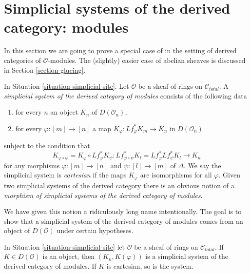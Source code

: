 








\section{Simplicial systems of the derived category: modules}
\label{section-glueing-modules}

\noindent
In this section we are going to prove a special case of
\cite[Proposition 3.2.9]{BBD} in the setting of derived
categories of $\mathcal{O}$-modules. The (slightly) easier
case of abelian sheaves is discussed in Section \ref{section-glueing}.

\begin{definition}
\label{definition-cartesian-derived-modules}
In Situation \ref{situation-simplicial-site}. Let $\mathcal{O}$
be a sheaf of rings on $\mathcal{C}_{total}$. A
{\it simplicial system of the derived category of modules}
consists of the following data
\begin{enumerate}
\item for every $n$ an object $K_n$ of $D(\mathcal{O}_n)$,
\item for every $\varphi : [m] \to [n]$ a map
$K_\varphi : Lf_\varphi^*K_m \to K_n$ in $D(\mathcal{O}_n)$
\end{enumerate}
subject to the condition that
$$
K_{\varphi \circ \psi} = K_\varphi \circ Lf_\varphi^*K_\psi :
Lf_{\varphi \circ \psi}^*K_l = Lf_\varphi^* Lf_\psi^*K_l
\longrightarrow
K_n
$$
for any morphisms $\varphi : [m] \to [n]$ and $\psi : [l] \to [m]$ of $\Delta$.
We say the simplicial system is {\it cartesian} if the maps $K_\varphi$
are isomorphisms for all $\varphi$.
Given two simplicial systems of the derived category
there is an obvious notion of a
{\it morphism of simplicial systems of the derived category of modules}.
\end{definition}

\noindent
We have given this notion a ridiculously long name intentionally.
The goal is to show that a simplicial system of the derived category
of modules comes from an object of $D(\mathcal{O})$ under certain
hypotheses.

\begin{lemma}
\label{lemma-cartesian-objects-derived-modules}
In Situation \ref{situation-simplicial-site} let $\mathcal{O}$ be a
sheaf of rings on $\mathcal{C}_{total}$.
If $K \in D(\mathcal{O})$ is an object, then $(K_n, K(\varphi))$
is a simplicial system of the derived category of modules.
If $K$ is cartesian, so is the system.
\end{lemma}

